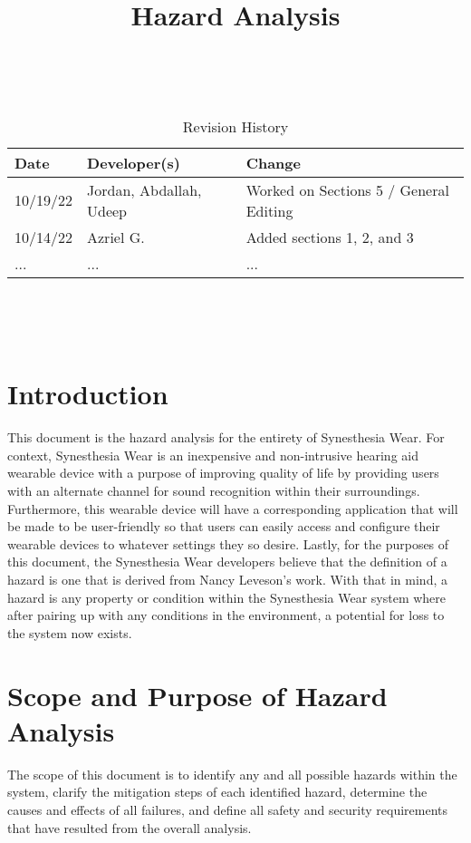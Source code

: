 \documentclass{article}
\title{Hazard Analysis\\\progname}
\author{\authname}
\date{}
\begin{document}
\maketitle
\thispagestyle{empty}

~\newpage


\begin{table}[hp]
\caption{Revision History} \label{TblRevisionHistory}
\begin{tabularx}{\textwidth}{llX}
\toprule
\textbf{Date} & \textbf{Developer(s)} & \textbf{Change}\\
\midrule
10/19/22 & Jordan, Abdallah, Udeep & Worked on Sections 5 / General Editing\\
10/14/22 & Azriel G. & Added sections 1, 2, and 3\\
... & ... & ...\\
\bottomrule
\end{tabularx}
\end{table}

~\newpage

\tableofcontents

~\newpage


\section{Introduction}
This document is the hazard analysis for the entirety of Synesthesia Wear.
For context, Synesthesia Wear is an inexpensive and non-intrusive hearing aid 
wearable device with a purpose of improving quality of life by providing users with 
an alternate channel for sound recognition within their surroundings. Furthermore, 
this wearable device will have a corresponding application that will be made to be 
user-friendly so that users can easily access and configure their wearable devices to 
whatever settings they so desire. Lastly, for the purposes of this document, the 
Synesthesia Wear developers believe that the definition of a hazard is one that is 
derived from Nancy Leveson's work. With that in mind, a hazard is any property or 
condition within the Synesthesia Wear system where after pairing up with any 
conditions in the environment, a potential for loss to the system now exists.

\section{Scope and Purpose of Hazard Analysis}
The scope of this document is to identify any and all possible hazards within 
the system, clarify the mitigation steps of each identified hazard, determine 
the causes and effects of all failures, and define all safety and security requirements 
that have resulted from the overall analysis.
\end{document}
